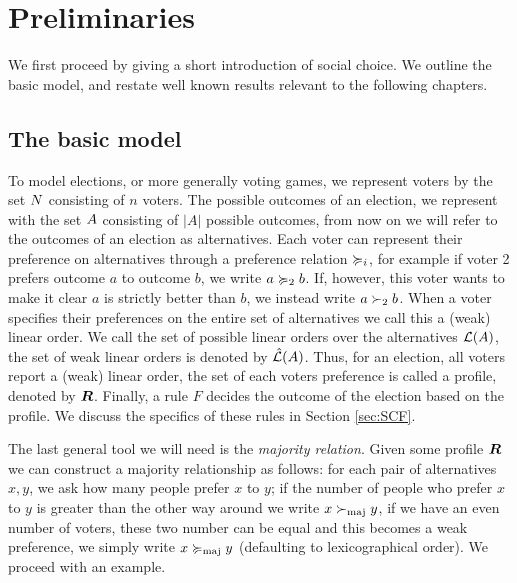 \chapter{Preliminaries}
\label{chap: preliminaries}
We first proceed by giving a short introduction of social choice. We outline the basic model, and restate well known results relevant to the following chapters.

\section{The basic model}
To model elections, or more generally voting games, we represent voters by the set $N$ consisting of $n$ voters. The possible outcomes of an election, we represent with the set $A$ consisting of $|A|$ possible outcomes, from now on we will refer to the outcomes of an election as alternatives. Each voter can represent their preference on alternatives through a preference relation $\succcurlyeq_i$, for example if voter 2 prefers outcome $a$ to outcome $b$, we write $a \succcurlyeq_2 b$. If, however, this voter wants to make it clear $a$ is strictly better than $b$, we instead write $a \succ_2 b$. When a voter specifies their preferences on the entire set of alternatives we call this a (weak) linear order. We call the set of possible linear orders over the alternatives $\mathcal{L}(A)$, the set of weak linear orders is denoted by $\hat{\mathcal{L}}(A)$. Thus, for an election, all voters report a (weak) linear order, the set of each voters preference is called a profile, denoted by $\boldsymbol{R}$. Finally, a rule $F$ decides the outcome of the election based on the profile. We discuss the specifics of these rules in Section \cref{sec:SCF}.

The last general tool we will need is the \textit{majority relation}. Given some profile $\boldsymbol{R}$ we can construct a majority relationship as follows: for each pair of alternatives $x,y$, we ask how many people prefer $x$ to $y$; if the number of people who prefer $x$ to $y$ is greater than the other way around we write $x  \succ_{\textnormal{maj}} y$, if we have an even number of voters, these two number can be equal and this becomes a weak preference, we simply write $x \succcurlyeq_{\textnormal{maj}} y$ (defaulting to lexicographical order). We proceed with an example.

